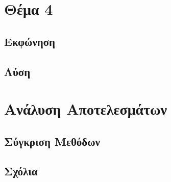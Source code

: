 \documentclass{report}
\begin{document}
% 
\chapter{Θέμα 4}
\section{Εκφώνηση}

\section{Λύση}


\chapter{Ανάλυση Αποτελεσμάτων}
\section{Σύγκριση Μεθόδων}

\section{Σχόλια}


\nocite{*} %


\end{document}
